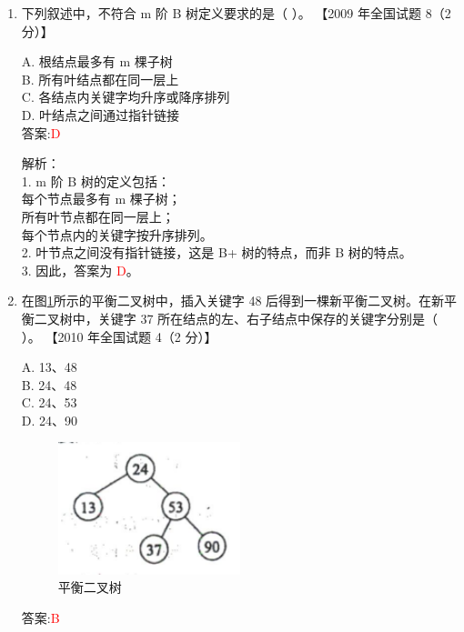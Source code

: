 \documentclass[lang=cn,newtx,10pt,scheme=chinese]{../../../elegantbook}
\begin{document}
\begin{enumerate}
    解析：\\
    1. 平衡二叉树（AVL 树）的定义是：任意节点的左右子树高度差的绝对值不超过 1，且左右子树也必须是平衡二叉树。\\
    2. 检查图中每棵树的左右子树高度差是否满足平衡二叉树的定义。\\
    3. 图中满足平衡二叉树定义的树即为答案。\\

\item 下列叙述中，不符合 m 阶 B 树定义要求的是（ ）。  
    【2009 年全国试题 8（2 分）】  

    A. 根结点最多有 m 棵子树 \\  
    B. 所有叶结点都在同一层上 \\  
    C. 各结点内关键字均升序或降序排列 \\  
    D. 叶结点之间通过指针链接 \\  

    答案:\textcolor{red}{D}

    解析：\\
    1. m 阶 B 树的定义包括：\\
        每个节点最多有 m 棵子树；\\
        所有叶节点都在同一层上；\\
        每个节点内的关键字按升序排列。\\
    2. 叶节点之间没有指针链接，这是 B+ 树的特点，而非 B 树的特点。\\
    3. 因此，答案为 \textcolor{red}{D}。\\

\item 在图\ref{fig:9-13}所示的平衡二叉树中，插入关键字 48 后得到一棵新平衡二叉树。在新平衡二叉树中，关键字 37 所在结点的左、右子结点中保存的关键字分别是（ ）。  
    【2010 年全国试题 4（2 分）】  

    A. 13、48 \\  
    B. 24、48 \\  
    C. 24、53 \\  
    D. 24、90 \\  

    \begin{figure}[h!]
        \centering
        \includegraphics[width=0.5\textwidth]{../../figure/exercisePicPDF/chapter9/9-13.pdf}
        \caption{平衡二叉树}
        \label{fig:9-13}
    \end{figure}
    答案:\textcolor{red}{B}


\end{enumerate}
\end{document}
